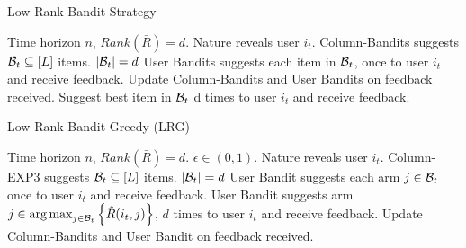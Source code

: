 %
%
%



\begin{algorithm}[!th]
\caption{Low Rank Bandit Strategy}
\label{alg:mLRBS}
\begin{algorithmic}[1]
 Time horizon $n$, $Rank(\bar{R}) = d$.
\State Nature reveals user $i_t$.  
\State Column-Bandits suggests $\mathcal{B}_t \subseteq [L]$ items. $|\mathcal{B}_t| = d$
\State User Bandits suggests each item in $\mathcal{B}_t$, once to user $i_t$ and receive feedback.
\State Update Column-Bandits and User Bandits on feedback  received.
\Else
\State Suggest best item in $\mathcal{B}_t$ d times to user $i_t$ and receive feedback.
\EndIf
\EndFor
\end{algorithmic}
\end{algorithm}

\begin{algorithm}[!th]
\caption{Low Rank Bandit Greedy (LRG)}
\label{alg:mLRBS1}
\begin{algorithmic}[1]
 Time horizon $n$, $Rank(\bar{R}) = d$.
 $\epsilon\in (0,1)$.
\State Nature reveals user $i_t$.  
\State Column-EXP3 suggests $\mathcal{B}_t\subseteq [L]$ items. $|\mathcal{B}_t| = d$
	 
\State User Bandit suggests each arm $j\in\mathcal{B}_t$ once to user $i_t$ and receive feedback.
\EndFor
{} 
\State User Bandit suggests arm $j\in \mathop{\rm arg\,max}_{j\in\mathcal{B}_t}\left\lbrace \hat{R}(i_t,j)\right\rbrace$, $d$ times to user $i_t$ and receive feedback.
\EndFor
\State Update Column-Bandits and User Bandit on feedback received.
\EndFor
\end{algorithmic}
\end{algorithm}


